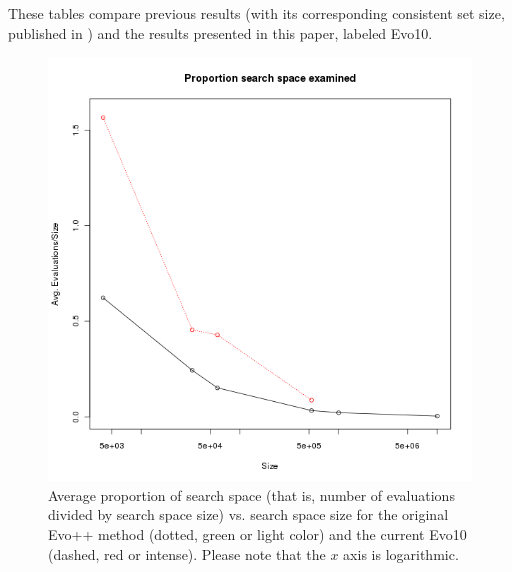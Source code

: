 \documentclass[conference]{IEEEtran}
\begin{document}
These tables compare previous results (with its corresponding
consistent set size, published in \cite{DBLP:conf/cec/GuervosMC11}) and the results presented in this paper, labeled
Evo10.
\begin{figure}[!htb]
\centering
\includegraphics[scale=0.50]{proportion.png}
\caption{Average proportion of search space (that is, number of evaluations divided by search space size)
  vs. search space size for the original Evo++ method (dotted, green or light
  color) and the current Evo10 (dashed, red or intense). Please note
  that the $x$ axis is logarithmic.   \label{fig:prop}}
\end{figure} 
%
\end{document}
